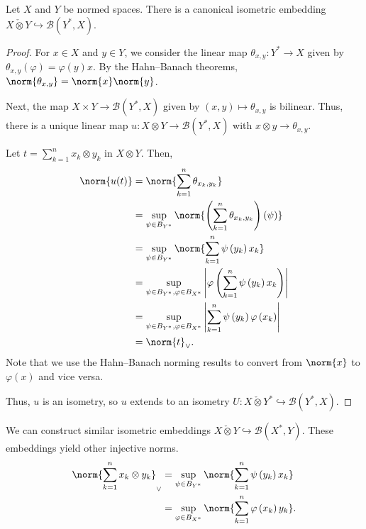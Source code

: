 \documentclass[10pt]{mypackage}
\begin{document}
\begin{proposition}
  Let $X$ and $Y$ be normed spaces. There is a canonical isometric embedding $X\check\otimes Y \hookrightarrow \mathcal{B}\left(Y^{\ast},X\right)$.
\end{proposition}
\begin{proof}
  For $x\in X$ and $y\in Y$, we consider the linear map $\theta_{x,y}: Y^{\ast}\rightarrow X$ given by $\theta_{x,y}\left(\varphi\right) = \varphi(y)x$. By the Hahn--Banach theorems, $\norm{\theta_{x,y}} = \norm{x}\norm{y}$.\newline

  Next, the map $X\times Y\rightarrow \mathcal{B}\left(Y^{\ast},X\right)$ given by $\left(x,y\right)\mapsto \theta_{x,y}$ is bilinear. Thus, there is a unique linear map $u: X\otimes Y \rightarrow \mathcal{B}\left(Y^{\ast},X\right)$ with $x\otimes y \rightarrow \theta_{x,y}$.\newline

  Let $t = \sum_{k=1}^{n}x_k\otimes y_k$ in $X\otimes Y$. Then,
  \begin{align*}
    \norm{u(t)} &= \norm{\sum_{k=1}^{n}\theta_{x_k,y_k}}\\
                &= \sup_{\psi\in B_{Y^{\ast}}}\norm{\left(\sum_{k=1}^{n}\theta_{x_k,y_k}\right)\left(\psi\right)}\\
                &= \sup_{\psi\in B_{Y^{\ast}}}\norm{\sum_{k=1}^{n}\psi\left(y_k\right)x_k}\\
                &= \sup_{\psi\in B_{Y^{\ast}},\varphi\in B_{X^{\ast}}}\left\vert \varphi\left(\sum_{k=1}^{n}\psi\left(y_k\right)x_k\right) \right\vert\\
                &= \sup_{\psi\in B_{Y^{\ast}},\varphi\in B_{X^{\ast}}}\left\vert \sum_{k=1}^{n}\psi\left(y_k\right)\varphi\left(x_k\right) \right\vert\\
                &= \norm{t}_{\vee}.
  \end{align*}
  Note that we use the Hahn--Banach norming results to convert from $\norm{x}$ to $\varphi(x)$ and vice versa.\newline

  Thus, $u$ is an isometry, so $u$ extends to an isometry $U: X\check\otimes Y^{\ast}\hookrightarrow \mathcal{B}\left(Y^{\ast},X\right)$.
\end{proof}
\begin{remark}
  We can construct similar isometric embeddings $X\check\otimes Y\hookrightarrow \mathcal{B}\left(X^{\ast},Y\right)$. These embeddings yield other injective norms.
  \begin{align*}
    \norm{\sum_{k=1}^{n}x_k\otimes y_k}_{\vee} &= \sup_{\psi\in B_{Y^{\ast}}}\norm{\sum_{k=1}^{n}\psi\left(y_k\right)x_k}\\
                                               &= \sup_{\varphi\in B_{X^{\ast}}}\norm{\sum_{k=1}^{n}\varphi\left(x_k\right)y_k}.
  \end{align*}
\end{remark}
\end{document}
